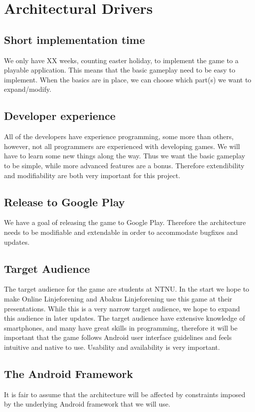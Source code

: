 \section{Architectural Drivers} 
\label{sec:architecturaldrivers}


\subsection{Short implementation time}
We only have XX weeks, counting easter holiday, to implement the game to a playable application. This means that the basic gameplay need to be easy to implement. When the basics are in place, we can choose which part(s) we want to expand/modify.

\subsection{Developer experience}
All of the developers have experience programming, some more than others, however, not all programmers are experienced with developing games. We will have to learn some new things along the way. Thus we want the basic gameplay to be simple, while more advanced features are a bonus. Therefore extendibility and modifiability are both very important for this project.

\subsection{Release to Google Play}
We have a goal of releasing the game to Google Play. Therefore the architecture needs to be modifiable and extendable in order to accommodate bugfixes and updates. 

\subsection{Target Audience}
The target audience for the game are students at NTNU. In the start we hope to make Online Linjeforening and Abakus Linjeforening use this game at their presentations. While this is a very narrow target audience, we hope to expand this audience in later updates. The target audience have extensive knowledge of smartphones, and many have great skills in programming, therefore it will be important that the game follows Android user interface guidelines and feels intuitive and native to use. Usability and availability is very important.

\subsection{The Android Framework}
It is fair to assume that the architecture will be affected by constraints imposed by the underlying Android framework that we will use.
